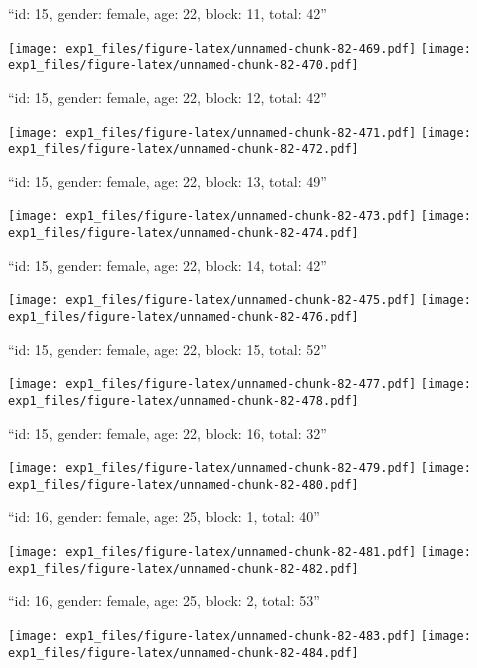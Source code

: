 \documentclass[11pt,,]{article}
\begin{document}
\newpage
[1] 

``id: 15, gender: female, age: 22, block: 11, total: 42''

\texttt{[image: exp1\_files/figure-latex/unnamed-chunk-82-469.pdf]}
\texttt{[image: exp1\_files/figure-latex/unnamed-chunk-82-470.pdf]}

\newpage
[1] 

``id: 15, gender: female, age: 22, block: 12, total: 42''

\texttt{[image: exp1\_files/figure-latex/unnamed-chunk-82-471.pdf]}
\texttt{[image: exp1\_files/figure-latex/unnamed-chunk-82-472.pdf]}

\newpage
[1] 

``id: 15, gender: female, age: 22, block: 13, total: 49''

\texttt{[image: exp1\_files/figure-latex/unnamed-chunk-82-473.pdf]}
\texttt{[image: exp1\_files/figure-latex/unnamed-chunk-82-474.pdf]}

\newpage
[1] 

``id: 15, gender: female, age: 22, block: 14, total: 42''

\texttt{[image: exp1\_files/figure-latex/unnamed-chunk-82-475.pdf]}
\texttt{[image: exp1\_files/figure-latex/unnamed-chunk-82-476.pdf]}

\newpage
[1] 

``id: 15, gender: female, age: 22, block: 15, total: 52''

\texttt{[image: exp1\_files/figure-latex/unnamed-chunk-82-477.pdf]}
\texttt{[image: exp1\_files/figure-latex/unnamed-chunk-82-478.pdf]}

\newpage
[1] 

``id: 15, gender: female, age: 22, block: 16, total: 32''

\texttt{[image: exp1\_files/figure-latex/unnamed-chunk-82-479.pdf]}
\texttt{[image: exp1\_files/figure-latex/unnamed-chunk-82-480.pdf]}

\newpage
[1] 

``id: 16, gender: female, age: 25, block: 1, total: 40''

\texttt{[image: exp1\_files/figure-latex/unnamed-chunk-82-481.pdf]}
\texttt{[image: exp1\_files/figure-latex/unnamed-chunk-82-482.pdf]}

\newpage
[1] 

``id: 16, gender: female, age: 25, block: 2, total: 53''

\texttt{[image: exp1\_files/figure-latex/unnamed-chunk-82-483.pdf]}
\texttt{[image: exp1\_files/figure-latex/unnamed-chunk-82-484.pdf]}
\end{document}
